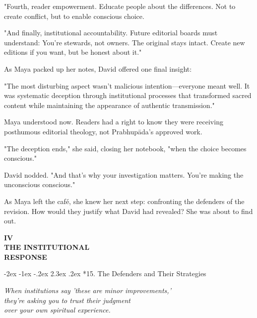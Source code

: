 \documentclass[12pt,twoside]{book}
\makeatletter
\def\cleardoublepage{\clearpage\if@twoside \ifodd\c@page\else\hbox{}\thispagestyle{empty}\newpage\if@twocolumn\hbox{}\newpage\fi\fi\fi}
\renewcommand\section{\@startsection{section}{1}{\z@}%
{-2ex \@plus -1ex \@minus -.2ex}%
{2.3ex \@plus.2ex}%
{\normalfont\Large\bfseries}}
\makeatother
\begin{document}
"Fourth, reader empowerment. Educate people about the differences. Not to create conflict, but to enable conscious choice.

"And finally, institutional accountability. Future editorial boards must understand: You're stewards, not owners. The original stays intact. Create new editions if you want, but be honest about it."

As Maya packed up her notes, David offered one final insight:

"The most disturbing aspect wasn't malicious intention—everyone meant well. It was systematic deception through institutional processes that transformed sacred content while maintaining the appearance of authentic transmission."

Maya understood now. Readers had a right to know they were receiving posthumous editorial theology, not Prabhupāda's approved work.

"The deception ends," she said, closing her notebook, "when the choice becomes conscious."

David nodded. "And that's why your investigation matters. You're making the unconscious conscious."

As Maya left the café, she knew her next step: confronting the defenders of the revision. How would they justify what David had revealed? She was about to find out.

\cleardoublepage
\thispagestyle{empty}
\vspace*{0.20\textheight}
\begin{center}
{\Huge\bfseries\MakeUppercase{\textbf{IV}}}\\[0.5cm]
{\huge\bfseries THE INSTITUTIONAL}\\[0.5cm]
{\huge\bfseries RESPONSE}
\end{center}
\vspace*{\fill}
\clearpage
\thispagestyle{empty} %
\mbox{}
\newpage

\cleardoublepage
\vspace*{0.20\textheight}
\section*{15. The Defenders and Their Strategies}
\thispagestyle{chapterpage}

{\centering\itshape When institutions say 'these are minor improvements,'\\they're asking you to trust their judgment\\over your own spiritual experience.\par}
\vspace{0.3cm}
\end{document}
